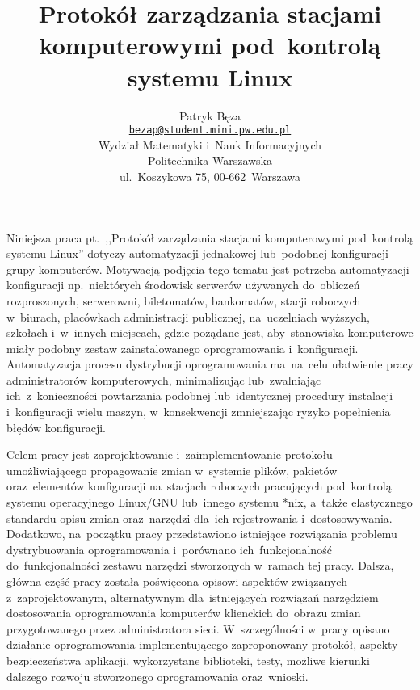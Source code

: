 \documentclass[12pt,a4paper]{article}
\begin{document}
\thispagestyle{empty}
\title{\textbf{Protokół zarządzania stacjami komputerowymi pod~kontrolą systemu Linux}}
\author{Patryk Bęza\\[-8pt]
\small \texttt{\href{mailto:bezap@student.mini.pw.edu.pl}{bezap@student.mini.pw.edu.pl}}\\[6pt]
\small Wydział Matematyki i~Nauk Informacyjnych\\[-8pt]
\small Politechnika Warszawska\\[-8pt]
\small ul.~Koszykowa 75, 00-662~Warszawa
}
\date{}
\maketitle\thispagestyle{empty}

Niniejsza praca pt.~,,Protokół zarządzania stacjami komputerowymi pod~kontrolą systemu Linux'' dotyczy automatyzacji jednakowej lub~podobnej konfiguracji grupy komputerów. Motywacją podjęcia tego tematu jest potrzeba automatyzacji konfiguracji np.~niektórych środowisk serwerów używanych do~obliczeń rozproszonych, serwerowni, biletomatów, bankomatów, stacji roboczych w~biurach, placówkach administracji publicznej, na~uczelniach wyższych, szkołach i~w~innych miejscach, gdzie pożądane jest, aby~stanowiska komputerowe miały podobny zestaw zainstalowanego oprogramowania i~konfiguracji. Automatyzacja procesu dystrybucji oprogramowania ma~na~celu ułatwienie pracy administratorów komputerowych, minimalizując lub~zwalniając ich~z~konieczności powtarzania podobnej lub~identycznej procedury instalacji i~konfiguracji wielu maszyn, w~konsekwencji zmniejszając ryzyko popełnienia błędów konfiguracji.

Celem pracy jest zaprojektowanie i~zaimplementowanie protokołu umożliwiającego propagowanie zmian w~systemie plików, pakietów oraz~elementów konfiguracji na~stacjach roboczych pracujących pod~kontrolą systemu operacyjnego Linux/GNU lub~innego systemu *nix, a~także elastycznego standardu opisu zmian oraz~narzędzi dla~ich rejestrowania i~dostosowywania. Dodatkowo, na~początku pracy przedstawiono istniejące rozwiązania problemu dystrybuowania oprogramowania i~porównano ich~funkcjonalność do~funkcjonalności zestawu narzędzi stworzonych w~ramach tej pracy. Dalsza, główna część pracy została poświęcona opisowi aspektów związanych z~zaprojektowanym, alternatywnym dla~istniejących rozwiązań narzędziem dostosowania oprogramowania komputerów klienckich do~obrazu zmian przygotowanego przez administratora sieci. W~szczególności w~pracy opisano działanie oprogramowania implementującego zaproponowany protokół, aspekty bezpieczeństwa aplikacji, wykorzystane biblioteki, testy, możliwe kierunki dalszego rozwoju stworzonego oprogramowania oraz~wnioski.
\end{document}
